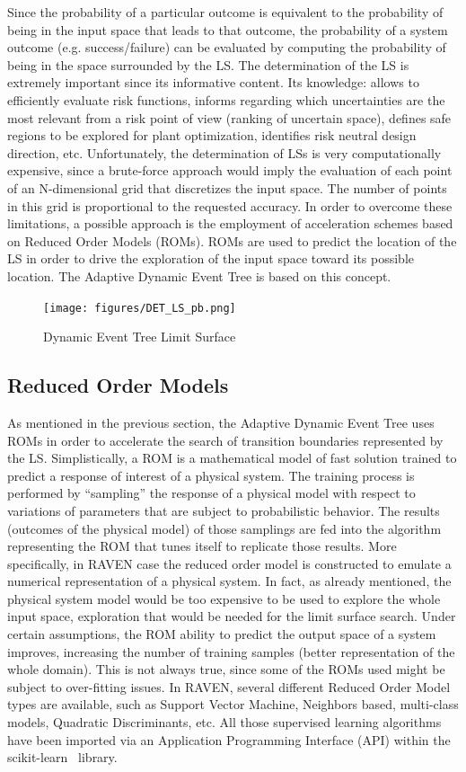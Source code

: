 Since the probability of a particular outcome is equivalent to the probability of being in the input space that leads to that outcome, the probability of a system outcome (e.g. success/failure) can be evaluated by computing the probability of being in the space surrounded by the LS.
The determination of the LS is extremely important since its informative content.  Its knowledge: allows to efficiently evaluate risk functions, informs regarding which uncertainties are the most relevant from a risk point of view (ranking of uncertain space), defines safe regions to be explored for plant optimization, identifies risk neutral design direction, etc. Unfortunately, the determination of LSs is very computationally expensive, since a brute-force approach would imply the evaluation of each point of an N-dimensional grid that discretizes the input space. The number of points in this grid is proportional to the requested accuracy. In order to overcome these limitations, a possible approach is the employment of acceleration schemes based on Reduced Order Models (ROMs). ROMs are used to predict the location of the LS in order to drive the exploration of the input space toward its possible location. The Adaptive Dynamic Event Tree is based on this concept.
\label{sec:ADET}
\begin{figure}[h]
  \centering
     \texttt{[image: figures/DET\_LS\_pb.png]}
  \caption{Dynamic Event Tree Limit Surface}
  \label{fig:LSDET}
\end{figure}
\subsection{Reduced Order Models}
\label{sec:ROMs}
As mentioned in the previous section, the Adaptive Dynamic Event Tree uses ROMs in order to accelerate the search of transition boundaries represented by the LS. Simplistically, a ROM is a mathematical model of fast solution trained to predict a response of interest of a physical system. The training process is performed by “sampling” the response of a physical model with respect to variations of parameters that are subject to probabilistic behavior. The results (outcomes of the physical model) of those samplings are fed into the algorithm representing the ROM that tunes itself to replicate those results. More specifically, in RAVEN case the reduced order model is constructed to emulate a numerical representation of a physical system. In fact, as already mentioned, the physical system model would be too expensive to be used to explore the whole input space, exploration that would be needed for the limit surface search. Under certain assumptions, the ROM ability to predict the output space of a system improves, increasing the number of training samples (better representation of the whole domain).  This is not always true, since some of the ROMs used might be subject to over-fitting issues.
In RAVEN, several different Reduced Order Model types are available, such as Support Vector Machine, Neighbors based, multi-class models, Quadratic Discriminants, etc. All those supervised learning algorithms have been imported via an Application Programming Interface (API) within the scikit-learn~\cite{scikitlearn} library.

